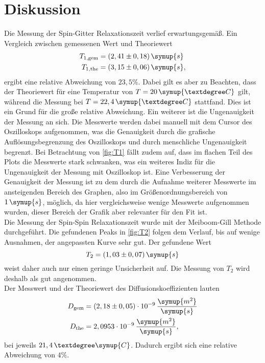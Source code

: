 \section{Diskussion}
Die Messung der Spin-Gitter Relaxationszeit verlief erwartungsgemäß. Ein Vergleich zwischen gemessenen Wert und Theoriewert\cite{SpinGitter}
\begin{align*}
    T_{1, \text{gem}} &= (2,41 \pm 0,18) \, \symup{s} \\
    T_{1, \text{the}} &= (3,15 \pm 0,06) \, \symup{s},
\end{align*}
ergibt eine relative Abweichung von $23,5\%$. Dabei gilt es aber zu Beachten, dass der Theoriewert für eine Temperatur
von $T = 20\,\symup{°C}$ gilt, während die Messung bei $T = 22,4\,\symup{°C}$ stattfand. 
Dies ist ein Grund für die große relative Abweichung. Ein weiterer ist die Ungenauigkeit der Messung an sich.
Die Messwerte werden dabei manuell mit dem Cursor des Oszilloskops aufgenommen, was die Genauigkeit durch 
die grafische Auflösungsbegrenzung des Oszilloskops und durch menschliche Ungenauigkeit begrenzt.
Bei Betrachtung von \autoref{fig:T1} fällt zudem auf, dass im flachen Teil des Plots die Messwerte 
stark schwanken, was ein weiteres Indiz für die Ungenauigkeit der Messung mit Oszilloskop ist.
Eine Verbesserung der Genauigkeit der Messung ist zu dem durch die Aufnahme weiterer Messwerte
im ansteigenden Bereich des Graphen, also im Größenordnungsbereich von $1\,\symup{s}$, möglich, da 
hier vergleichsweise wenige Messwerte aufgenommen wurden, dieser Bereich der Grafik aber relevanter 
für den Fit ist.\\
Die Messung der Spin-Spin Relaxationszeit wurde mit der Meiboom-Gill Methode durchgeführt.
Die gefundenen Peaks in \autoref{fig:T2} folgen dem Verlauf, bis auf wenige Ausnahmen,
der angepassten Kurve sehr gut. Der gefundene Wert 
\begin{equation*}
    T_2 = (1,03 \pm 0,07) \, \symup{s}
\end{equation*}
weist daher auch nur einen geringe Unsicherheit auf.
Die Messung von $T_2$ wird deshalb als gut angenommen.\\
Der Messwert und der Theoriewert\cite{diff} des Diffusionskoeffizienten lauten 
\begin{align*}
    D_{\text{gem}} &= (2,18 \pm 0,05 ) \cdot 10^{-9} \, \frac{\symup{m^2}}{\symup{s}} \\
    D_{\text{the}} &= 2,0953\cdot 10^{-9} \, \frac{\symup{m^2}}{\symup{s}},
\end{align*}
bei jeweils $21,4 \,°\symup{C}$. Dadurch ergibt sich eine relative Abweichung von $4\%$.
